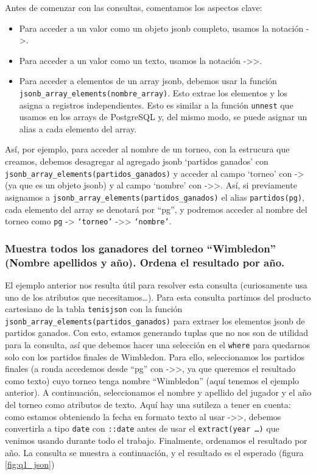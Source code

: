 \noindent Antes de comenzar con las consultas, comentamos los aspectos clave:
\begin{itemize}
\item Para acceder a un valor como un objeto jsonb completo, usamos la notación ->. 
\item Para acceder a un valor como un texto, usamos la notación ->>.
\item Para acceder a elementos de un array jsonb, debemos usar la función \texttt{jsonb\_array\_elements(nombre\_array)}. Esto extrae los elementos y los asigna a registros independientes. Esto es similar a la función \texttt{unnest} que usamos en los arrays de PostgreSQL y, del mismo modo, se puede asignar un alias a cada elemento del array.
\end{itemize}

Así, por ejemplo, para acceder al nombre de un torneo, con la estrucura que creamos, debemos desagregar al agregado jsonb `partidos ganados' con \texttt{jsonb\_array\_elements(partidos\_ganados)} y acceder al campo `torneo' con -> (ya que es un objeto jsonb) y al campo `nombre' con ->>. Así, si previamente asignamos a \texttt{jsonb\_array\_elements(partidos\_ganados)} el alias \texttt{partidos(pg)}, cada elemento del array se denotará por ``pg'', y podremos acceder al nombre del torneo como \texttt{pg} -> \texttt{`torneo'} ->> \texttt{`nombre'}. 

\subsubsection{Muestra todos los ganadores del torneo ``Wimbledon'' (Nombre apellidos y año). Ordena el resultado por año.}

El ejemplo anterior nos resulta útil para resolver esta consulta (curiosamente usa uno de los atributos que necesitamos\dots). Para esta consulta partimos del producto cartesiano de la tabla \texttt{tenisjson} con la función \texttt{jsonb\_array\_elements(partidos\_ganados)} para extraer los elementos jsonb de partidos ganados. Con esto, estamos generando tuplas que no nos son de utilidad para la consulta, así que debemos hacer una selección en el \texttt{where} para quedarnos solo con los partidos finales de Wimbledon. Para ello, seleccionamos los partidos finales (a ronda accedemos desde ``pg'' con ->>, ya que queremos el resultado como texto) cuyo torneo tenga nombre ``Wimbledon'' (aquí tenemos el ejemplo anterior). A continuación, seleccionamos el nombre y apellido del jugador y el año del torneo como atributos de texto. Aquí hay una sutileza a tener en cuenta: como estamos obteniendo la fecha en formato texto al usar ->>, debemos convertirla a tipo \texttt{date} con \texttt{::date} antes de usar el \texttt{extract(year \dots)} que venimos usando durante todo el trabajo. Finalmente, ordenamos el resultado por año. La consulta se muestra a continuación, y el resultado es el esperado (figura \ref{fig:q1_json})

